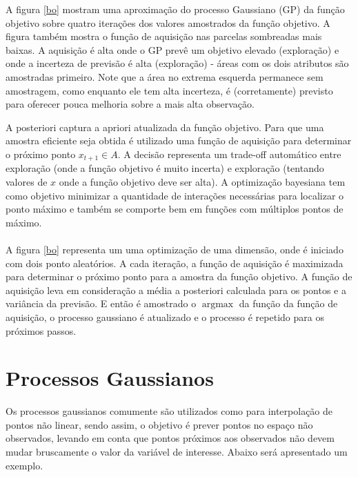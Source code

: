 \documentclass[
	12pt,				%
	openright,			%
	twoside,			%
	a4paper,			%
	english,			%
	french,				%
	spanish,			%
	brazil,				%
]{abntex2}
\begin{document}
A figura \ref{bo} mostram uma aproximação do processo Gaussiano (GP) da
função objetivo sobre quatro iterações dos valores amostrados da função
objetivo. A figura também mostra o função de aquisição nas parcelas
sombreadas mais baixas. A aquisição é alta onde o GP prevê um objetivo
elevado (exploração) e onde a incerteza de previsão é alta (exploração)
- áreas com os dois atributos são amostradas primeiro. Note que a área
no extrema esquerda permanece sem amostragem, como enquanto ele tem alta
incerteza, é (corretamente) previsto para oferecer pouca melhoria sobre
a mais alta observação.

A posteriori captura a apriori atualizada da função objetivo. Para que
uma amostra eficiente seja obtida é utilizado uma função de aquisição
para determinar o próximo ponto \(x_{t+1} \in A\). A decisão representa
um trade-off automático entre exploração (onde a função objetivo é muito
incerta) e exploração (tentando valores de \(x\) onde a função objetivo
deve ser alta). A optimização bayesiana tem como objetivo minimizar a
quantidade de interações necessárias para localizar o ponto máximo e
também se comporte bem em funções com múltiplos pontos de máximo.\\
~\\

A figura \ref{bo} representa um uma optimização de uma dimensão, onde é
iniciado com dois ponto aleatórios. A cada iteração, a função de
aquisição é maximizada para determinar o próximo ponto para a amostra da
função objetivo. A função de aquisição leva em consideração a média a
posteriori calculada para os pontos e a variância da previsão. E então é
amostrado o \(\operatorname{argmax}\) da função da função de aquisição,
o processo gaussiano é atualizado e o processo é repetido para os
próximos passos.\\

\hypertarget{processos-gaussianos}{%
\section{Processos Gaussianos}\label{processos-gaussianos}}

Os processos gaussianos comumente são utilizados como para interpolação
de pontos não linear, sendo assim, o objetivo é prever pontos no espaço
não observados, levando em conta que pontos próximos aos observados não
devem mudar bruscamente o valor da variável de interesse. Abaixo será
apresentado um exemplo.\\
\end{document}
